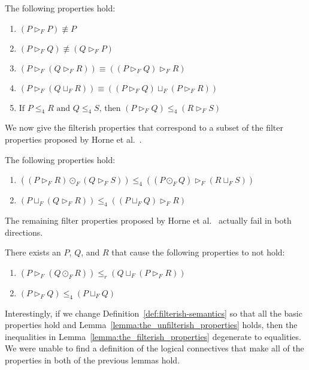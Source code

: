\begin{lemma}
  \label{lemma:basic_properties_for_parallel}
  The following properties hold:
  \begin{enumerate}
  \item $(P \rhd_F P) \not\equiv P$\\[-5px]
  \item $(P \rhd_F Q) \not\equiv (Q \rhd_F P)$\\[-5px]
  \item $(P \rhd_F (Q \rhd_F R)) \equiv ((P \rhd_F Q) \rhd_F R)$\\[-5px]
  \item $(P \rhd_F (Q \sqcup_F R)) \equiv ((P \rhd_F Q) \sqcup_F (P \rhd_F R))$\\[-5px]
  \item $\text{If }P \leq_4 R \text{ and } Q \leq_4 S \text{, then } (P \rhd_F Q) \leq_4 (R \rhd_F S)$
  \end{enumerate}
\end{lemma}
We now give the filterish properties that correspond to a subset of
the filter properties proposed by Horne et
al.~\cite{horne2017semantics}.
\begin{lemma}
  \label{lemma:the_filterish_properties}
  The following properties hold:
  \begin{enumerate}
  \item $((P \rhd_F R) \odot_F (Q \rhd_F S)) \leq_4 ((P \odot_F Q) \rhd_F (R \sqcup_F S))$\\[-5px]
  \item $(P \sqcup_F (Q \rhd_F R)) \leq_4 ((P \sqcup_F Q) \rhd_F R)$
  \end{enumerate}
\end{lemma}
The remaining filter properties proposed by Horne et
al.~\cite{horne2017semantics} actually fail in both directions.
\begin{lemma}
  \label{lemma:the_unfilterish_properties}
  There exists an $P$, $Q$, and $R$ that cause the following
  properties to not hold:
  \begin{enumerate}
  \item $(P \rhd_F (Q \odot_F R)) \leq_r (Q \sqcup_F (P \rhd_F R))$\\[-5px]
  \item $(P \rhd_F Q) \leq_4 (P \sqcup_F Q)$
  \end{enumerate}
\end{lemma}
Interestingly, if we change Definition~\ref{def:filterish-semantics}
so that all the basic properties hold and
Lemma~\ref{lemma:the_unfilterish_properties} holds, then the
inequalities in Lemma~\ref{lemma:the_filterish_properties} degenerate
to equalities.  We were unable to find a definition of the logical
connectives that make all of the properties in both of the previous
lemmas hold.

